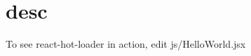 \chapter{desc}
\hypertarget{md__d_1_2_g_i_t_2_food_link_2foodlink_8client_2node__modules_2bs-recipes_2recipes_2webpack_8react-hot-loader_2desc}{}\label{md__d_1_2_g_i_t_2_food_link_2foodlink_8client_2node__modules_2bs-recipes_2recipes_2webpack_8react-hot-loader_2desc}
To see {\ttfamily react-\/hot-\/loader} in action, edit {\ttfamily js/\+Hello\+World.\+jsx} 